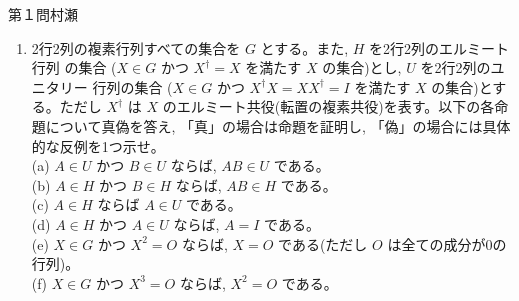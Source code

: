 \begin{question}{第１問}{村瀬}
\begin{enumerate}
  \begin{enumerate}
  \item パウリ行列の積 $\sigma_j \sigma_k (j,k=1，2, 3)$ を求めよ。
  \item 実3元ベクトル $\bm{v}$ に対して行列
    $S(\bm{v})$ を $S(\bm{v})=\bm{v}\cdot\sigma=v_1\sigma_1+v_2\sigma_2+v_3\sigma_3$ で定
    義する。$S$ の積 $S(\bm{a})S(\bm{b})$ を単位行列 $I$ とパウリ行列 $\sigma_j$ の線形結合で表せ。
  \item 実3元単位ベクトル $\bm{n}$ および実数 $\theta$ に対して, 行列 $X(\bm{n}, \theta)$ を
    \begin{align*}
      X(\bm{n}, \theta) &=\e^{-\i\theta S(\bm{n})}
    \end{align*}
    で定義する。ただし行列 $A$ に対して
    \begin{align*}
      \e^A &= \sum_{k=0}^\infty \frac{A^k}{k!}
    \end{align*}
    である。$X(\bm{n}, \theta)$ を単位行列 $I$ とパウリ行列 $\sigma_j$ の線形結合で表せ。
  \item{}
    $X(\bm{n}, \theta)S(\bm{v})X(\bm{n},-\theta)$ が $S(\bm{v}')$ の形に表せることを示し, $\bm{v}'$ を $\bm{n}, \bm{v}, \bm{n}\times\bm{v}$ の
    線形結合で表せ。ただし $\times$ はベクトル積(外積)を表す。
  \item $\bm{n}$ と $\bm{v}$ が直交しているとき, $0\le\theta\le2\pi$ において
    設問()の $\bm{r}'$ がどのように変化するか説明せよ。
  \end{enumerate}
\item
  2行2列の複素行列すべての集合を $G$ とする。また, $H$ を2行2列のエルミート行列
  の集合 ($X\in G$ かつ $X^\dag=X$ を満たす $X$ の集合)とし, $U$ を2行2列のユニタリー
  行列の集合 ($X\in G$ かつ $X^\dag X = XX^\dag=I$ を満たす $X$ の集合)とする。ただし $X^\dag$
  は $X$ のエルミート共役(転置の複素共役)を表す。以下の各命題について真偽を答え, 
  「真」の場合は命題を証明し, 「偽」の場合には具体的な反例を1つ示せ。\\
  (a) $A\in U$ かつ $B\in U$ ならば, $AB\in U$ である。\\
  (b) $A\in H$ かつ $B\in H$ ならば, $AB\in H$ である。\\
  (c) $A\in H$ ならば $A∈U$ である。\\
  (d) $A\in H$ かつ $A\in U$ ならば, $A=I$ である。\\
  (e) $X\in G$ かつ $X^2=O$ ならば, $X=O$ である(ただし $O$ は全ての成分が0の行列)。\\
  (f) $X\in G$ かつ $X^3=O$ ならば, $X^2=O$ である。
\end{enumerate}
\end{question}
